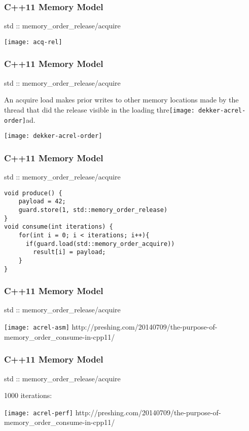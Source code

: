 \begin{frame}
    \frametitle{C++11 Memory Model}
    \LARGE
    std :: memory\_order\_release/acquire
    
    \centering
    \texttt{[image: acq-rel]}
\end{frame}
\begin{frame}
    \frametitle{C++11 Memory Model}
    \LARGE
    std :: memory\_order\_release/acquire
    
    \normalsize
    An acquire load makes prior writes to other memory locations
    made by the thread that did the release visible in the loading
    thre\texttt{[image: dekker-acrel-order]}ad.
    
    
    \texttt{[image: dekker-acrel-order]}
\end{frame}

\begin{frame}[fragile]
    \frametitle{C++11 Memory Model}
    \LARGE
    std :: memory\_order\_release/acquire
\normalsize    
\begin{block}{}
    \begin{verbatim}
void produce() {
    payload = 42;
    guard.store(1, std::memory_order_release)
}
void consume(int iterations) {
    for(int i = 0; i < iterations; i++){
      if(guard.load(std::memory_order_acquire))
        result[i] = payload;
    }
}
\end{verbatim}
\end{block}

\end{frame}


\begin{frame}
    \frametitle{C++11 Memory Model}
    \LARGE
    std :: memory\_order\_release/acquire
    
    
    \texttt{[image: acrel-asm]}
    \tiny
    http://preshing.com/20140709/the-purpose-of-memory\_order\_consume-in-cpp11/
    
\end{frame}

\begin{frame}
    \frametitle{C++11 Memory Model}
    \LARGE
    std :: memory\_order\_release/acquire
    
    1000 iterations:
    
    \texttt{[image: acrel-perf]}
    \tiny
    http://preshing.com/20140709/the-purpose-of-memory\_order\_consume-in-cpp11/
    
\end{frame}

